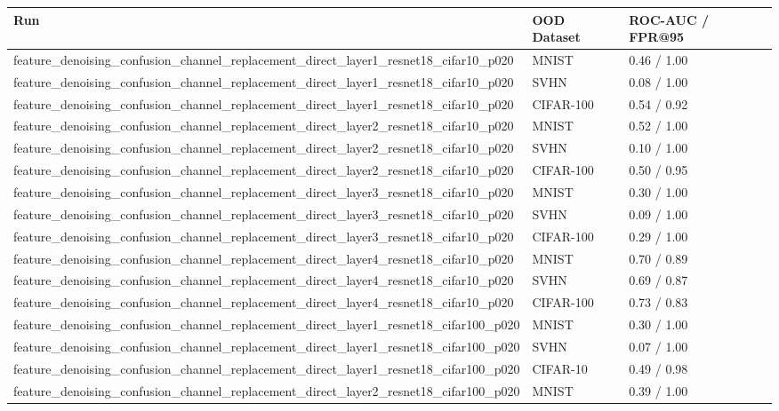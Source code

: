 \begin{tabular}{lll}
\toprule
Run & OOD Dataset & ROC-AUC / FPR@95 \\
\midrule
feature\_denoising\_confusion\_channel\_replacement\_direct\_layer1\_resnet18\_cifar10\_p020 & MNIST & 0.46 / 1.00 \\
feature\_denoising\_confusion\_channel\_replacement\_direct\_layer1\_resnet18\_cifar10\_p020 & SVHN & 0.08 / 1.00 \\
feature\_denoising\_confusion\_channel\_replacement\_direct\_layer1\_resnet18\_cifar10\_p020 & CIFAR-100 & 0.54 / 0.92 \\
feature\_denoising\_confusion\_channel\_replacement\_direct\_layer2\_resnet18\_cifar10\_p020 & MNIST & 0.52 / 1.00 \\
feature\_denoising\_confusion\_channel\_replacement\_direct\_layer2\_resnet18\_cifar10\_p020 & SVHN & 0.10 / 1.00 \\
feature\_denoising\_confusion\_channel\_replacement\_direct\_layer2\_resnet18\_cifar10\_p020 & CIFAR-100 & 0.50 / 0.95 \\
feature\_denoising\_confusion\_channel\_replacement\_direct\_layer3\_resnet18\_cifar10\_p020 & MNIST & 0.30 / 1.00 \\
feature\_denoising\_confusion\_channel\_replacement\_direct\_layer3\_resnet18\_cifar10\_p020 & SVHN & 0.09 / 1.00 \\
feature\_denoising\_confusion\_channel\_replacement\_direct\_layer3\_resnet18\_cifar10\_p020 & CIFAR-100 & 0.29 / 1.00 \\
feature\_denoising\_confusion\_channel\_replacement\_direct\_layer4\_resnet18\_cifar10\_p020 & MNIST & 0.70 / 0.89 \\
feature\_denoising\_confusion\_channel\_replacement\_direct\_layer4\_resnet18\_cifar10\_p020 & SVHN & 0.69 / 0.87 \\
feature\_denoising\_confusion\_channel\_replacement\_direct\_layer4\_resnet18\_cifar10\_p020 & CIFAR-100 & 0.73 / 0.83 \\
feature\_denoising\_confusion\_channel\_replacement\_direct\_layer1\_resnet18\_cifar100\_p020 & MNIST & 0.30 / 1.00 \\
feature\_denoising\_confusion\_channel\_replacement\_direct\_layer1\_resnet18\_cifar100\_p020 & SVHN & 0.07 / 1.00 \\
feature\_denoising\_confusion\_channel\_replacement\_direct\_layer1\_resnet18\_cifar100\_p020 & CIFAR-10 & 0.49 / 0.98 \\
feature\_denoising\_confusion\_channel\_replacement\_direct\_layer2\_resnet18\_cifar100\_p020 & MNIST & 0.39 / 1.00 \\

\end{tabular}

